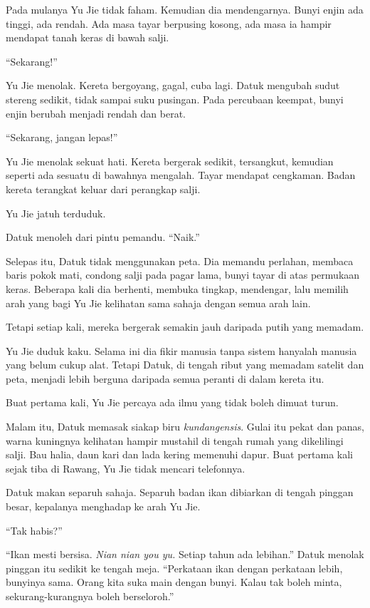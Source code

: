\documentclass[
  11pt,
  a5paper,
  openany,
  oneside]{book}
\begin{document}
Pada mulanya Yu Jie tidak faham. Kemudian dia mendengarnya. Bunyi enjin
ada tinggi, ada rendah. Ada masa tayar berpusing kosong, ada masa ia
hampir mendapat tanah keras di bawah salji.

``Sekarang!''

Yu Jie menolak. Kereta bergoyang, gagal, cuba lagi. Datuk mengubah sudut
stereng sedikit, tidak sampai suku pusingan. Pada percubaan keempat,
bunyi enjin berubah menjadi rendah dan berat.

``Sekarang, jangan lepas!''

Yu Jie menolak sekuat hati. Kereta bergerak sedikit, tersangkut,
kemudian seperti ada sesuatu di bawahnya mengalah. Tayar mendapat
cengkaman. Badan kereta terangkat keluar dari perangkap salji.

Yu Jie jatuh terduduk.

Datuk menoleh dari pintu pemandu. ``Naik.''

Selepas itu, Datuk tidak menggunakan peta. Dia memandu perlahan, membaca
baris pokok mati, condong salji pada pagar lama, bunyi tayar di atas
permukaan keras. Beberapa kali dia berhenti, membuka tingkap, mendengar,
lalu memilih arah yang bagi Yu Jie kelihatan sama sahaja dengan semua
arah lain.

Tetapi setiap kali, mereka bergerak semakin jauh daripada putih yang
memadam.

Yu Jie duduk kaku. Selama ini dia fikir manusia tanpa sistem hanyalah
manusia yang belum cukup alat. Tetapi Datuk, di tengah ribut yang
memadam satelit dan peta, menjadi lebih berguna daripada semua peranti
di dalam kereta itu.

Buat pertama kali, Yu Jie percaya ada ilmu yang tidak boleh dimuat
turun.

Malam itu, Datuk memasak siakap biru \emph{kundangensis}. Gulai itu
pekat dan panas, warna kuningnya kelihatan hampir mustahil di tengah
rumah yang dikelilingi salji. Bau halia, daun kari dan lada kering
memenuhi dapur. Buat pertama kali sejak tiba di Rawang, Yu Jie tidak
mencari telefonnya.

Datuk makan separuh sahaja. Separuh badan ikan dibiarkan di tengah
pinggan besar, kepalanya menghadap ke arah Yu Jie.

``Tak habis?''

``Ikan mesti bersisa. \emph{Nian nian you yu.} Setiap tahun ada
lebihan.'' Datuk menolak pinggan itu sedikit ke tengah meja. ``Perkataan
ikan dengan perkataan lebih, bunyinya sama. Orang kita suka main dengan
bunyi. Kalau tak boleh minta, sekurang-kurangnya boleh berseloroh.''
\end{document}
